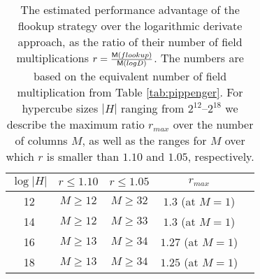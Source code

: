 \documentclass[11pt]{article}
\theoremstyle{definition}
\theoremstyle{remark}
\begin{document}
%
\begin{table}[h!]
\caption{%
The estimated performance advantage of the flookup strategy over the logarithmic derivate approach, as the ratio of their number of field multiplications $r =\nicefrac{\mathsf M({flookup})}{\mathsf M({logD})}$.
The numbers are based on the equivalent number of field multiplication from Table \ref{tab:pippenger}.
For hypercube sizes $|H|$ ranging from $2^{12}$--$2^{18}$ we describe the maximum ratio $r_{max}$ over the number of columns $M$, as well as the ranges for $M$ over which $r$ is smaller than $1.10$ and $1.05$, respectively.
}
\label{tab:uv:comparison}
\vspace*{0.5cm}
\centering
\begin{tabular} {|c|c|c|c|c|}
\hline
$\log|H|$ & $r\leq 1.10$ & $r\leq 1.05$ & $r_{max}$ 
\\\hline
12 & $M\geq 12$ & $M\geq 32$ & $1.3$ (at $M = 1$) 
\\
14 & $M\geq 12$ & $M\geq 33$ & $1.3$ (at $M = 1$)  
\\
16 &$M\geq 13$ & $M\geq 34$ & $1.27$ (at $M = 1$)  
\\
18 &$M\geq 13$ & $M\geq 34$ & $1.25$ (at $M = 1$)  
\\\hline
\end{tabular}
\end{table}
\end{document}
